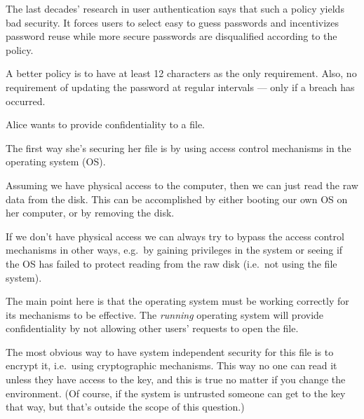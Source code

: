 \begin{solution}
The last decades' research in user authentication says that such a policy yields 
bad security.
It forces users to select easy to guess passwords and incentivizes password 
reuse while more secure passwords are disqualified according to the policy.

A better policy is to have at least 12 characters as the only requirement.
Also, no requirement of updating the password at regular intervals --- only if a 
breach has occurred.
\end{solution}
\question[3]
  Alice wants to provide confidentiality to a file.

  \begin{solution}
    The first way she's securing her file is by using access control mechanisms 
    in the operating system (OS).

    Assuming we have physical access to the computer, then we can just read the 
    raw data from the disk.
    This can be accomplished by either booting our own OS on her computer, or 
    by removing the disk.

    If we don't have physical access we can always try to bypass the access 
    control mechanisms in other ways, e.g.\ by gaining privileges in the system 
    or seeing if the OS has failed to protect reading from the raw disk (i.e.\ 
    not using the file system).

    The main point here is that the operating system must be working correctly 
    for its mechanisms to be effective.
    The \emph{running} operating system will provide confidentiality by not 
    allowing other users' requests to open the file.

    The most obvious way to have system independent security for this file is 
    to encrypt it, i.e.~using cryptographic mechanisms.
    This way no one can read it unless they have access to the key, and this is 
    true no matter if you change the environment.
    (Of course, if the system is untrusted someone can get to the key that way, 
    but that's outside the scope of this question.)
  \end{solution}


